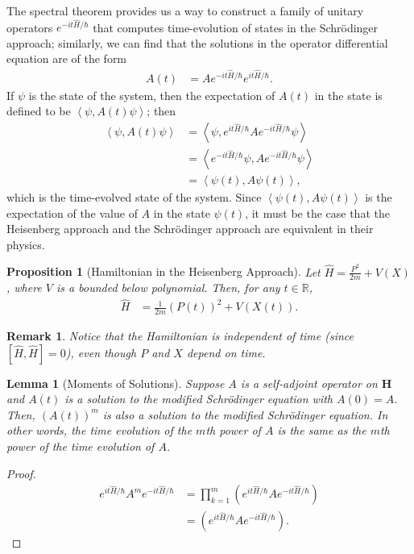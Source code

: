 \documentclass[10pt]{extarticle}
\newtheorem*{remark}{Remark}
\newcommand{\R}{\mathbb{R}}
\newcommand{\iprod}[2]{\left\langle #1,#2\right\rangle}
\theoremstyle{plain}
\newtheorem*{lemma}{Lemma}%
\newtheorem*{proposition}{Proposition}%
\theoremstyle{definition}
\theoremstyle{remark}
\begin{document}
  The spectral theorem provides us a way to construct a family of unitary operators $e^{-it\hat{H}/\hbar}$ that computes time-evolution of states in the Schrödinger approach; similarly, we can find that the solutions in the operator differential equation are of the form
  \begin{align*}
    A(t) &= Ae^{-it\hat{H}/\hbar}e^{it\hat{H}/\hbar}.
  \end{align*}
  If $\psi$ is the state of the system, then the expectation of $A(t)$ in the state is defined to be $\iprod{\psi}{A(t)\psi}$; then
  \begin{align*}
    \iprod{\psi}{A(t)\psi} &= \iprod{\psi}{e^{it\hat{H}/\hbar}Ae^{-it\hat{H}/\hbar}\psi}\\
                           &= \iprod{e^{-it\hat{H}/\hbar}\psi}{Ae^{-it\hat{H}/\hbar}\psi}\\
                           &= \iprod{\psi(t)}{A\psi(t)},
  \end{align*}
  which is the time-evolved state of the system. Since $\iprod{\psi(t)}{A\psi(t)}$ is the expectation of the value of $A$ in the state $\psi(t)$, it must be the case that the Heisenberg approach and the Schrödinger approach are equivalent in their physics.
  \begin{proposition}[Hamiltonian in the Heisenberg Approach]
    Let $\hat{H} = \frac{P^2}{2m} + V(X)$, where $V$ is a bounded below polynomial. Then, for any $t\in \R$,
    \begin{align*}
      \hat{H} &= \frac{1}{2m}\left(P(t)\right)^2 + V(X(t)).
    \end{align*}
  \end{proposition}
  \begin{remark}
    Notice that the Hamiltonian is independent of time (since $[\hat{H},\hat{H}] = 0$), even though $P$ and $X$ depend on time.
  \end{remark}
  \begin{lemma}[Moments of Solutions]
    Suppose $A$ is a self-adjoint operator on $\mathbf{H}$ and $A(t)$ is a solution to the modified Schrödinger equation with $A(0) = A$. Then, $\left(A(t)\right)^m$ is also a solution to the modified Schrödinger equation. In other words, the time evolution of the $m$th power of $A$ is the same as the $m$th power of the time evolution of $A$.
  \end{lemma}
  \begin{proof}
    \begin{align*}
      e^{it\hat{H}/\hbar}A^{m}e^{-it\hat{H}/\hbar} &= \prod_{k=1}^{m}\left(e^{it\hat{H}/\hbar}Ae^{-it\hat{H}/\hbar}\right)\\
                                                   &= \left(e^{it\hat{H}/\hbar}Ae^{-it\hat{H}/\hbar}\right).
    \end{align*}
  \end{proof}
\end{document}
